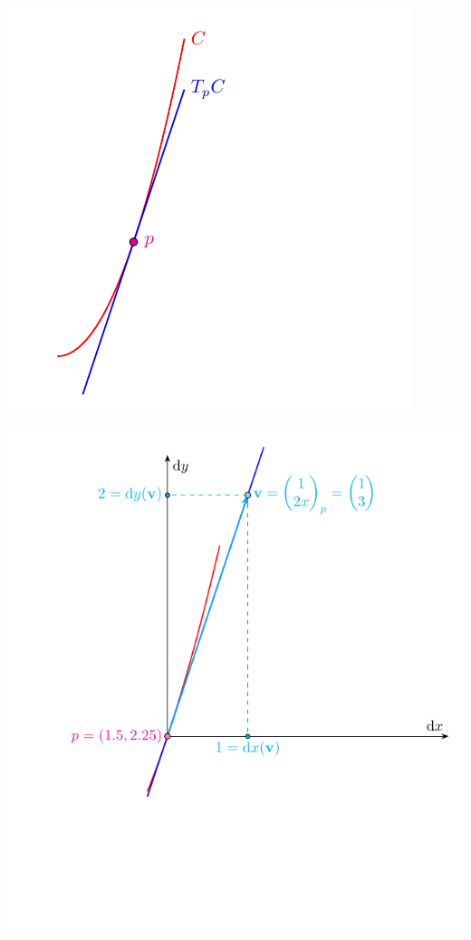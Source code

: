 \documentclass[11pt,openany]{article}
\begin{document}
\begin{center}
\begin{minipage}{.49\textwidth}
	\includegraphics[scale=1]{tangent-space-example-4-1.pdf}
\end{minipage}\hfill
\begin{minipage}{.49\textwidth}
	\includegraphics[scale=.8]{tangent-space-example-4.pdf}
\end{minipage}
\end{center}
\end{document}
